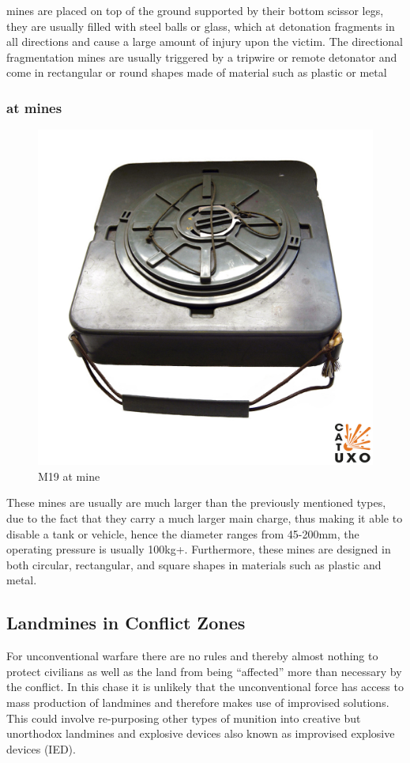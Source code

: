 mines are placed on top of the ground supported by their bottom scissor legs, they are usually filled with steel balls or glass, which at detonation fragments in all directions and cause a large amount of injury upon the victim. The directional fragmentation mines are usually triggered by a tripwire or remote detonator and come in rectangular or round shapes made of material such as plastic or metal \cite{mine_detection}


\subsubsection*{\gls{at} mines} 

\begin{figure}
\vspace{-8mm}
\centering
\includegraphics[width=0.5\linewidth]{00 - Images/m19i-003a.jpg}
  \caption{M19 \gls{at} mine \cite{m19}}
  \label{fig:m19}
\end{figure}

These mines are usually are much larger than the previously mentioned types, due to the fact that they carry a much larger main charge, thus making it able to disable a tank or vehicle, hence the diameter ranges from 45-200mm, the operating pressure is usually 100kg+. Furthermore, these mines are designed in both circular, rectangular, and square shapes in materials such as plastic and metal. \cite{mine_detection}

\subsection{Landmines in Conflict Zones}

For unconventional warfare there are no rules and thereby almost nothing to protect civilians as well as the land from being “affected” more than necessary by the conflict. In this chase it is unlikely that the unconventional force has access to mass production of landmines and therefore makes use of improvised solutions. This could involve re-purposing other types of munition into creative but unorthodox landmines and explosive devices also known as improvised explosive devices (IED).

